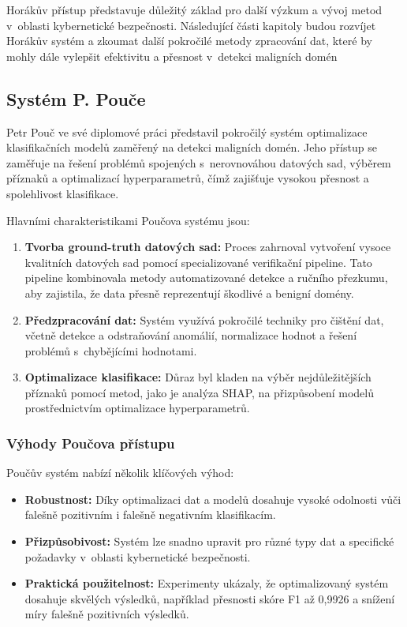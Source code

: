 Horákův přístup představuje důležitý základ pro další výzkum a vývoj metod v~oblasti kybernetické bezpečnosti. Následující části kapitoly budou rozvíjet Horákův systém a zkoumat další pokročilé metody zpracování dat, které by mohly dále vylepšit efektivitu a přesnost v~detekci maligních domén \cite{ovi}


\subsection{Systém P. Pouče}
Petr Pouč ve své diplomové práci \cite{petr} představil pokročilý systém optimalizace klasifikačních modelů zaměřený na detekci maligních domén. Jeho přístup se zaměřuje na řešení problémů spojených s~nerovnováhou datových sad, výběrem příznaků a optimalizací hyperparametrů, čímž zajišťuje vysokou přesnost a spolehlivost klasifikace.

Hlavními charakteristikami Poučova systému jsou:
\begin{enumerate}
    \item \textbf{Tvorba ground-truth datových sad:} Proces zahrnoval vytvoření vysoce kvalitních datových sad pomocí specializované verifikační pipeline. Tato pipeline kombinovala metody automatizované detekce a ručního přezkumu, aby zajistila, že data přesně reprezentují škodlivé a benigní domény.
    \item \textbf{Předzpracování dat:} Systém využívá pokročilé techniky pro čištění dat, včetně detekce a odstraňování anomálií, normalizace hodnot a řešení problémů s~chybějícími hodnotami. 
    \item \textbf{Optimalizace klasifikace:} Důraz byl kladen na výběr nejdůležitějších příznaků pomocí metod, jako je analýza SHAP, na přizpůsobení modelů prostřednictvím optimalizace hyperparametrů. 
\end{enumerate}

\subsubsection*{Výhody Poučova přístupu}
Poučův systém nabízí několik klíčových výhod:
\begin{itemize}
    \item \textbf{Robustnost:} Díky optimalizaci dat a modelů dosahuje vysoké odolnosti vůči falešně pozitivním i falešně negativním klasifikacím.
    \item \textbf{Přizpůsobivost:} Systém lze snadno upravit pro různé typy dat a specifické požadavky v~oblasti kybernetické bezpečnosti.
    \item \textbf{Praktická použitelnost:} Experimenty ukázaly, že optimalizovaný systém dosahuje skvělých výsledků, například přesnosti skóre F1  až 0,9926 a snížení míry falešně pozitivních výsledků.
\end{itemize}

